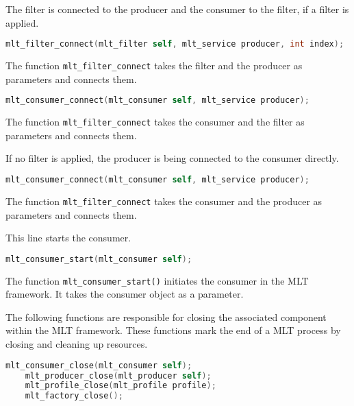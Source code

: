 \documentclass[../MasterThesis.tex]{subfiles}
\begin{document}
\begin{description}[font=\color{RedViolet!80!black}, style=nextline]
	The filter is connected to the producer and the consumer to the filter, if a filter is applied.
	
	\begin{lstlisting}[language=C, numbers=none, columns=fullflexible, belowskip=0pt, aboveskip=9pt]
	mlt_filter_connect(mlt_filter self, mlt_service producer, int index); \end{lstlisting}

	The function \texttt{mlt\_filter\_connect} takes the filter and the producer as parameters and connects them.
	
	\begin{lstlisting}[language=C, numbers=none, columns=fullflexible, belowskip=0pt, aboveskip=9pt]
	mlt_consumer_connect(mlt_consumer self, mlt_service producer); \end{lstlisting}

	The function \texttt{mlt\_filter\_connect} takes the consumer and the filter as parameters and connects them.
	
	
	If no filter is applied, the producer is being connected to the consumer directly.
	
	\begin{lstlisting}[language=C, numbers=none, columns=fullflexible, belowskip=0pt, aboveskip=9pt]
	mlt_consumer_connect(mlt_consumer self,	mlt_service producer); \end{lstlisting}
	
	The function \texttt{mlt\_filter\_connect} takes the consumer and the producer as parameters and connects them.
	
	
	\item[Start consumer] 
	
	This line starts the consumer.
	
	\begin{lstlisting}[language=C, numbers=none, columns=fullflexible, belowskip=0pt, aboveskip=9pt]
	mlt_consumer_start(mlt_consumer self);	\end{lstlisting}

	The function \texttt{mlt\_consumer\_start()} initiates the consumer in the MLT framework. It takes the consumer object as a parameter. 
	
	
	
	
	
	\item[Close the components]
	
	The following functions are responsible for closing the associated component within the MLT framework. These functions mark the end of a MLT process by closing and cleaning up resources.
	
	\begin{lstlisting}[language=C, numbers=none, columns=fullflexible, belowskip=0pt, aboveskip=9pt]
	mlt_consumer_close(mlt_consumer self); 
	mlt_producer_close(mlt_producer self); 
	mlt_profile_close(mlt_profile profile); 
	mlt_factory_close();\end{lstlisting}
	
	
\end{description}
\end{document}
